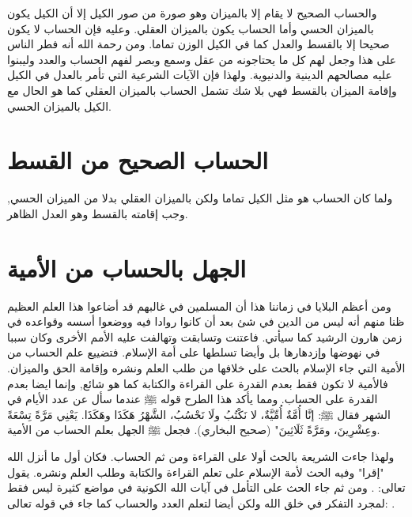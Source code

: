 والحساب الصحيح لا يقام إلا بالميزان وهو صورة من صور الكيل إلا أن الكيل يكون بالميزان الحسي وأما الحساب يكون بالميزان العقلي. وعليه فإن الحساب لا يكون صحيحا إلا بالقسط والعدل كما في الكيل الوزن تماما. ومن رحمة الله أنه فطر الناس على هذا وجعل لهم كل ما يحتاجونه من عقل وسمع وبصر لفهم الحساب والعدد وليبنوا عليه مصالحهم الدينية والدنيوية. ولهذا فإن الآيات الشرعية التي تأمر بالعدل في الكيل وإقامة الميزان بالقسط فهي بلا شك تشمل الحساب بالميزان العقلي كما هو الحال مع الكيل بالميزان الحسي.


\section{الحساب الصحيح من القسط}
ولما كان الحساب هو مثل الكيل تماما ولكن بالميزان العقلي بدلا من الميزان الحسي, وجب إقامته بالقسط وهو العدل الظاهر.

\section{الجهل بالحساب من الأمية}

ومن أعظم البلايا في زماننا هذا أن المسلمين في غالبهم قد أضاعوا هذا العلم العظيم ظنا منهم أنه ليس من الدين في شئ بعد أن كانوا روادا فيه ووضعوا أسسه وقواعده في زمن هارون الرشيد كما سيأتي. فاعتنت وتسابقت وتهالفت عليه الأمم الأخرى وكان سببا في نهوضها وإزدهارها بل وأيضا تسلطها على أمة الإسلام. فتضييع علم الحساب من الأمية التي جاء الإسلام بالحث على خلافها من طلب العلم ونشره وإقامة الحق والميزان. فالأمية لا تكون فقط بعدم القدرة على القراءة والكتابة كما هو شائع, وإنما ايضا بعدم القدرة على الحساب.
ومما يأكد هذا الطرح قوله ﷺ عندما سأل عن عدد الأيام في الشهر فقال ﷺ:
إنَّا أُمَّةٌ أُمِّيَّةٌ، لا نَكْتُبُ ولَا نَحْسُبُ، الشَّهْرُ هَكَذَا وهَكَذَا. يَعْنِي مَرَّةً تِسْعَةً وعِشْرِينَ، ومَرَّةً ثَلَاثِينَ"
{\footnotesize (صحيح البخاري)}.
فجعل ﷺ الجهل بعلم الحساب من الأمية.

ولهذا جاءت الشريعة بالحث أولا على القراءة ومن ثم الحساب. فكان أول ما أنزل الله "إقرا" وفيه الحث لأمة الإسلام على تعلم القراءة والكتابة وطلب العلم ونشره.
يقول تعالى:
\quranayah*[96][1-5]{\footnotesize \surahname*[96]}.
ومن ثم جاء الحث على التأمل في آيات الله الكونية في مواضع كثيرة ليس فقط لمجرد التفكر في خلق الله ولكن أيضا لتعلم العدد والحساب كما جاء في قوله تعالى:
\quranayah*[10][5]{\footnotesize \surahname*[10]}.


